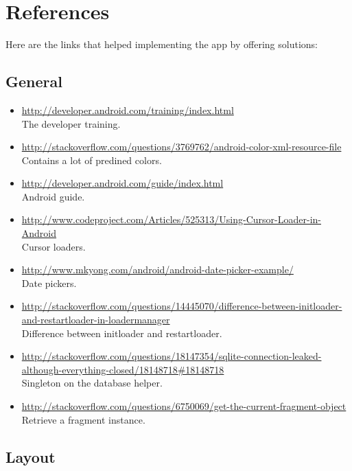 
\section{References}
\label{references}

Here are the links that helped implementing the app by offering solutions:

\subsection{General}

\begin{itemize}
	\item \url{http://developer.android.com/training/index.html} \\The developer training.
	\item \url{http://stackoverflow.com/questions/3769762/android-color-xml-resource-file} \\Contains a lot of predined colors.
	\item \url{http://developer.android.com/guide/index.html} \\Android guide.
	\item \url{http://www.codeproject.com/Articles/525313/Using-Cursor-Loader-in-Android} \\Cursor loaders.
	\item \url{http://www.mkyong.com/android/android-date-picker-example/} \\Date pickers.
	\item \url{http://stackoverflow.com/questions/14445070/difference-between-initloader-and-restartloader-in-loadermanager} \\Difference between initloader and restartloader.
	\item \url{http://stackoverflow.com/questions/18147354/sqlite-connection-leaked-although-everything-closed/18148718#18148718} \\Singleton on the database helper.
	\item \url{http://stackoverflow.com/questions/6750069/get-the-current-fragment-object} \\Retrieve a fragment instance.
\end{itemize}

\subsection{Layout}

